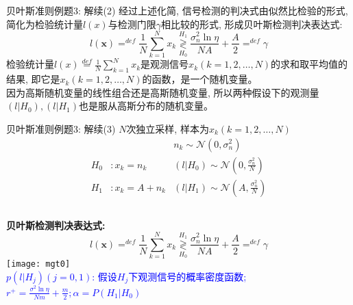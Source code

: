 \begin{frame}[shrink]{贝叶斯准则例题3: 解续(2)}
经过上述化简, 信号检测的判决式由似然比检验的形式, 简化为检验统计量$l(x)$与检测门限$\gamma$相比较的形式, 形成贝叶斯检测判决表达式:
\[
l(\bm{x})\mathop{=}^{def}\frac{1}{N}\sum\limits_{k=1}^{N}x_k\mathop{\gtrless}\limits_{H_0}^{H_1}\frac{\sigma_n^2\ln\eta}{NA}+\frac{A}{2}\mathop{=}^{def}\gamma
\]
检验统计量$l(x)\mathop{=}\limits^{def}\frac{1}{N}\sum\limits_{k=1}^Nx_k$是观测信号$x_k(k=1,2,\dots,N)$的求和取平均值的结果, 即它是$x_k(k=1,2,\dots,N)$的函数，是一个随机变量。\\
因为高斯随机变量的线性组合还是高斯随机变量,  所以两种假设下的观测量$(l|H_0),(l|H_1)$也是服从高斯分布的随机变量。
\end{frame}

\begin{frame}[shrink]{贝叶斯准则例题3: 解续(3)}
$N$次独立采样, 样本为$x_k(k=1,2,\dots,N)$
\begin{align*}
&&n_k\sim\mathcal{N}(0,\sigma_n^2)\\ 
H_0 &:x_k=n_k   &(l|H_0)\sim\mathcal{N}(0,\frac{\sigma_n^2}{N})\\
H_1 &:x_k=A+n_k &(l|H_1)\sim\mathcal{N}(A,\frac{\sigma_n^2}{N})
\end{align*}
\begin{columns}
\textbf{贝叶斯检测判决表达式:}\\
\[
l(\bm{x})\mathop{=}^{def}\frac{1}{N}\sum\limits_{k=1}^{N}x_k\mathop{\gtrless}\limits_{H_0}^{H_1}\frac{\sigma_n^2\ln\eta}{NA}+\frac{A}{2}\mathop{=}^{def}\gamma
\]
\texttt{[image: mgt0]}\\
\scriptsize
\textcolor{blue}{$p(l|H_j)(j=0,1)$: 假设$H_j$下观测信号的概率密度函数; $r^+=\frac{\sigma^2\ln\eta}{Nm}+\frac{m}{2}; \alpha=P(H_1|H_0)$}
\end{columns}
\end{frame}

